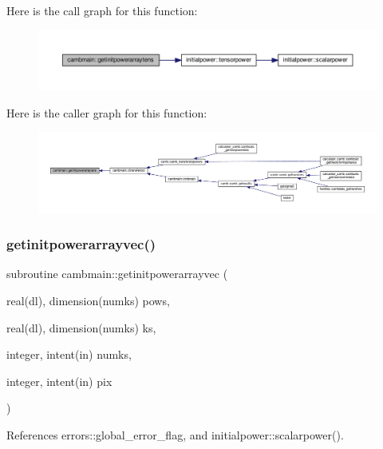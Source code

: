 Here is the call graph for this function\+:
\nopagebreak
\begin{figure}[H]
\begin{center}
\leavevmode
\includegraphics[width=350pt]{namespacecambmain_af4005843871d59b0973861e895fdb0d3_cgraph}
\end{center}
\end{figure}
Here is the caller graph for this function\+:
\nopagebreak
\begin{figure}[H]
\begin{center}
\leavevmode
\includegraphics[width=350pt]{namespacecambmain_af4005843871d59b0973861e895fdb0d3_icgraph}
\end{center}
\end{figure}
\mbox{\label{namespacecambmain_a5fb4d38dca7390cd662572152b12f7d0}} 
\subsubsection{\texorpdfstring{getinitpowerarrayvec()}{getinitpowerarrayvec()}}
{\footnotesize\ttfamily subroutine cambmain\+::getinitpowerarrayvec (\begin{DoxyParamCaption}\item[{real(dl), dimension(numks)}]{pows,  }\item[{real(dl), dimension(numks)}]{ks,  }\item[{integer, intent(in)}]{numks,  }\item[{integer, intent(in)}]{pix }\end{DoxyParamCaption})}



References errors\+::global\+\_\+error\+\_\+flag, and initialpower\+::scalarpower().



